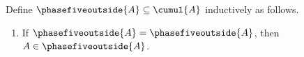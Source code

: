 \begin{inductive}\label{phase5_nested_outside_membership}
    Define $\phasefiveoutside{A}\subseteq\cumul{A}$ inductively as follows.
    \begin{enumerate}
        \item If $\phasefiveoutside{A}=\phasefiveoutside{A}$, then
            $A\in\phasefiveoutside{A}$.
    \end{enumerate}
\end{inductive}
